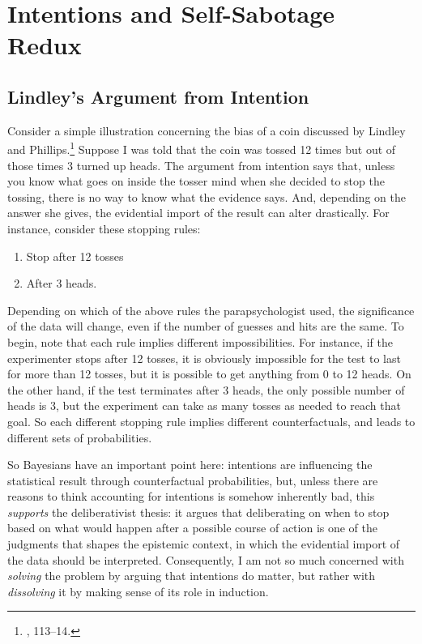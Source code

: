 \hypertarget{intentions-and-self-sabotage-redux}{%
\section{Intentions and Self-Sabotage
Redux}\label{sec:intentions-and-self-sabotage-redux}}
\subsection{Lindley's Argument from Intention}
Consider a simple illustration concerning the bias of a coin discussed
by Lindley and Phillips.\footnote{\cite{lindleybern}, 113--14.} Suppose I was told
that the coin was tossed 12 times but out of those times 3 turned up
heads. The argument from intention says that, unless you know what goes
on inside the tosser mind when she decided to stop the tossing, there is
no way to know what the evidence says. And, depending on the answer she
gives, the evidential import of the result can alter drastically. For
instance, consider these stopping rules:

\begin{enumerate}
\def\labelenumi{\arabic{enumi}.}
\tightlist
\item
  Stop after 12 tosses
\item
  After 3 heads.
\end{enumerate}

Depending on which of the above rules the
parapsychologist used, the significance of the data will change, even if
the number of guesses and hits are the same. To begin, note that each
rule implies different impossibilities. For instance, if the
experimenter stops after 12 tosses, it is obviously impossible for the
test to last for more than 12 tosses, but it is possible to get anything from 0 to 12 heads. On the other hand, if
the test terminates after 3 heads, the only possible number of heads is
3, but the experiment can take as many tosses as needed to reach that
goal. So each different stopping rule implies different counterfactuals,
and leads to different sets of probabilities.

So Bayesians have an important point here: intentions are influencing
the statistical result through counterfactual probabilities, but, unless
there are reasons to think accounting for intentions is somehow
inherently bad, this \emph{supports} the deliberativist thesis: it argues that deliberating on when to stop based on what would happen after a possible course of action is one of the judgments that shapes the epistemic context, in which the evidential import of the data should be interpreted. Consequently, I am not so much concerned with \emph{solving} the problem by arguing that intentions do matter, but rather with \emph{dissolving} it by making sense of its role in induction. 

